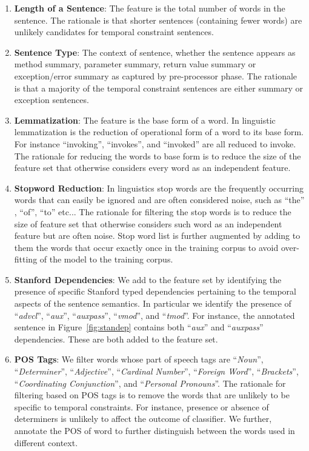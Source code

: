 \begin{enumerate}

	\item \textbf{Length of a Sentence}: The feature is the total number of words in  the sentence. The rationale is that shorter sentences (containing fewer words) are unlikely candidates for temporal constraint sentences. 

	\item \textbf{Sentence Type}: The context of sentence, whether the sentence appears as method summary, parameter summary, return value summary or exception/error summary as captured by pre-processor phase. The rationale is that a majority of the temporal constraint sentences are either summary or exception sentences. 
	
	\item \textbf{Lemmatization}: The feature is the base form of a word. In linguistic lemmatization is the reduction of operational form of a word to its base form. For instance ``invoking'', ``invokes'', and ``invoked'' are all reduced to invoke. The rationale for reducing the words to base form is to reduce the size of the feature set that otherwise considers every word as an independent feature.  
	
	\item \textbf{Stopword Reduction}: In linguistics stop words are the frequently occurring words that can easily be ignored and are often considered noise, such as ``the'' , ``of'', ``to'' etc... The rationale for filtering the stop words is to reduce the size of feature set that otherwise considers such word as an independent feature but are often noise. Stop word list is further augmented by adding to them the words that occur exactly once in the training corpus to avoid over-fitting of the model to the training corpus.  
	
	\item \textbf{Stanford Dependencies}: We add to the feature set by identifying the presence of specific Stanford typed dependencies pertaining to the temporal aspects of the sentence semantics. In particular we identify the presence of ``\textit{advcl}'', ``\textit{aux}'', ``\textit{auxpass}'', ``\textit{vmod}'', and ``\textit{tmod}''. For instance, the annotated sentence in Figure~\ref{fig:standep} contains both ``\textit{aux}'' and ``\textit{auxpass}'' dependencies. These are both added to the feature set.
	
	\item \textbf{POS Tags}: We filter words whose part of speech tags are ``\textit{Noun}'', ``\textit{Determiner}'', ``\textit{Adjective}'', ``\textit{Cardinal Number}'', ``\textit{Foreign Word}'', ``\textit{Brackets}'', ``\textit{Coordinating Conjunction}'', and ``\textit{Personal Pronouns}''. The rationale for filtering based on POS tags is to remove the words that are unlikely to be specific to temporal constraints. For instance, presence or absence of determiners is unlikely to affect the outcome of classifier. We further, annotate the POS of word to further distinguish between the words used in different context.       
		 
\end{enumerate}     


